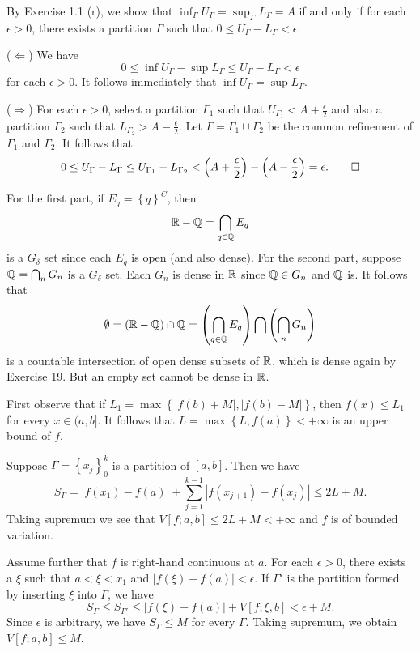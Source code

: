 
\begin{exercise}{1.15}
  By Exercise 1.1 (r),
  we show that $\inf_{\Gamma} U_\Gamma = \sup_{\Gamma} L_\Gamma = A$
  if and only if for each $\epsilon > 0$,
  there exists a partition $\Gamma$ such that $0 \le U_\Gamma - L_\Gamma < \epsilon$.

  ($\Longleftarrow$) We have
  \[
    0 \le \inf U_\Gamma - \sup L_\Gamma \le U_\Gamma - L_\Gamma < \epsilon
  \]
  for each $\epsilon > 0$.
  It follows immediately that $\inf U_\Gamma = \sup L_\Gamma$.

  ($\Longrightarrow$) For each $\epsilon > 0$,
  select a partition $\Gamma_1$ such that $U_{\Gamma_1} < A + \frac{\epsilon}{2}$
  and also a partition $\Gamma_2$ such that $L_{\Gamma_2} > A - \frac{\epsilon}{2}$.
  Let $\Gamma = \Gamma_1 \cup \Gamma_2$ be the common refinement of $\Gamma_1$ and $\Gamma_2$.
  It follows that
  \[
    0 \le U_{\Gamma} - L_{\Gamma} \le U_{\Gamma_1} - L_{\Gamma_2}
    < \left( A + \frac{\epsilon}{2} \right) - \left( A - \frac{\epsilon}{2} \right) = \epsilon.
    \qedhere
  \]
\end{exercise}

\begin{exercise}{1.20}
  For the first part, if $E_q = \left\{ q \right\}^C$, then
  \[
    \mathbb{R} - \mathbb{Q} = \bigcap_{q \in \mathbb{Q}} E_q
  \]
  is a $G_\delta$ set since each $E_q$ is open (and also dense).
  For the second part,
  suppose $\mathbb{Q} = \bigcap_n G_n$ is a $G_\delta$ set.
  Each $G_n$ is dense in $\mathbb{R}$ since $\mathbb{Q} \in G_n$ and $\mathbb{Q}$ is.
  It follows that
  \[
    \emptyset = \left( \mathbb{R} - \mathbb{Q} \right) \cap \mathbb{Q}
    = \left( \bigcap_{q \in \mathbb{Q}} E_q \right) \bigcap \left( \bigcap_n G_n \right)
  \]
  is a countable intersection of open dense subsets of $\mathbb{R}$,
  which is dense again by Exercise 19.
  But an empty set cannot be dense in $\mathbb{R}$.
\end{exercise}

\begin{exercise}{2.5}
  First observe that if $L_1 = \max \left\{ |f(b) + M|, |f(b) - M| \right\}$,
  then $f(x) \le L_1$ for every $x \in (a, b]$.
  It follows that $L = \max \left\{ L, f(a) \right\} < + \infty$
  is an upper bound of $f$.

  Suppose $\Gamma = \left\{ x_j \right\}_0^k$ is a partition of $[a, b]$.
  Then we have
  \[
    S_{\Gamma} = \left| f(x_1) - f(a) \right| +
    \sum_{j = 1}^{k-1} \left| f(x_{j+1}) - f(x_j) \right|
    \le 2L + M.
  \]
  Taking supremum we see that $V[f;a,b] \le 2L + M < +\infty$
  and $f$ is of bounded variation.

  Assume further that $f$ is right-hand continuous at $a$.
  For each $\epsilon > 0$, there exists a $\xi$ such that
  $a < \xi < x_1$ and $|f(\xi) - f(a)| < \epsilon$.
  If $\Gamma'$ is the partition formed by inserting $\xi$ into $\Gamma$,
  we have
  \[
    S_\Gamma \le S_{\Gamma'} \le \left| f(\xi) - f(a) \right| + V[f; \xi, b]
    < \epsilon + M.
  \]
  Since $\epsilon$ is arbitrary, we have $S_{\Gamma} \le M$ for every $\Gamma$.
  Taking supremum, we obtain $V[f;a,b] \le M$.
\end{exercise}

